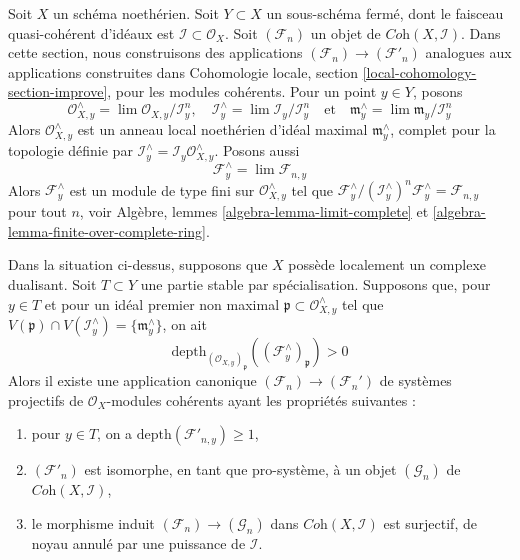 \noindent
Soit $X$ un schéma noethérien. Soit $Y \subset X$ un sous-schéma fermé,
dont le faisceau quasi-cohérent d'idéaux est $\mathcal{I} \subset \mathcal{O}_X$.
Soit $(\mathcal{F}_n)$ un objet de $\textit{Coh}(X, \mathcal{I})$.
Dans cette section, nous construisons des applications
$(\mathcal{F}_n) \to (\mathcal{F}'_n)$
analogues aux applications construites dans
Cohomologie locale, section \ref{local-cohomology-section-improve},
pour les modules cohérents. Pour un point $y \in Y$, posons
$$
\mathcal{O}_{X, y}^\wedge = \lim \mathcal{O}_{X, y}/\mathcal{I}^n_y, \quad
\mathcal{I}_y^\wedge = \lim \mathcal{I}_y/\mathcal{I}^n_y
\quad\text{et}\quad
\mathfrak m_y^\wedge = \lim \mathfrak m_y/\mathcal{I}_y^n
$$
Alors $\mathcal{O}_{X, y}^\wedge$ est un anneau local noethérien
d'idéal maximal $\mathfrak m_y^\wedge$, complet pour la topologie définie par
$\mathcal{I}_y^\wedge = \mathcal{I}_y\mathcal{O}_{X, y}^\wedge$.
Posons aussi
$$
\mathcal{F}_y^\wedge = \lim \mathcal{F}_{n, y}
$$
Alors $\mathcal{F}_y^\wedge$ est un module de type fini sur
$\mathcal{O}_{X, y}^\wedge$ tel que
$\mathcal{F}_y^\wedge/(\mathcal{I}_y^\wedge)^n\mathcal{F}_y^\wedge =
\mathcal{F}_{n, y}$ pour tout $n$, voir Algèbre, lemmes
\ref{algebra-lemma-limit-complete} et
\ref{algebra-lemma-finite-over-complete-ring}.

\begin{lemma}
\label{lemma-divide-torsion-formal-coherent-module}
Dans la situation ci-dessus, supposons que $X$ possède localement un complexe dualisant.
Soit $T \subset Y$ une partie stable par spécialisation.
Supposons que, pour $y \in T$ et pour un idéal premier non maximal
$\mathfrak p \subset \mathcal{O}_{X, y}^\wedge$ tel que
$V(\mathfrak p) \cap V(\mathcal{I}^\wedge_y) = \{\mathfrak m_y^\wedge\}$,
on ait
$$
\text{depth}_{(\mathcal{O}_{X, y})_\mathfrak p}
((\mathcal{F}^\wedge_y)_\mathfrak p) > 0
$$
Alors il existe une application canonique
$(\mathcal{F}_n) \to (\mathcal{F}_n')$
de systèmes projectifs de $\mathcal{O}_X$-modules cohérents
ayant les propriétés suivantes :
\begin{enumerate}
\item pour $y \in T$, on a $\text{depth}(\mathcal{F}'_{n, y}) \geq 1$,
\item $(\mathcal{F}'_n)$ est isomorphe, en tant que pro-système, à un objet
$(\mathcal{G}_n)$ de $\textit{Coh}(X, \mathcal{I})$,
\item le morphisme induit
$(\mathcal{F}_n) \to (\mathcal{G}_n)$ dans
$\textit{Coh}(X, \mathcal{I})$ est surjectif, de noyau
annulé par une puissance de $\mathcal{I}$.
\end{enumerate}
\end{lemma}


